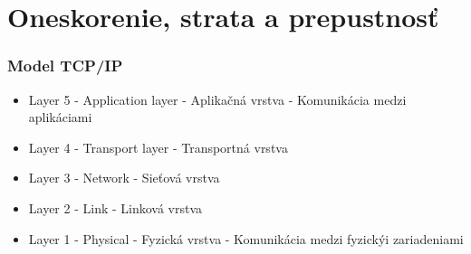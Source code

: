 \documentclass[10pt,xcolor=pdflatex,hyperref={unicode}]{beamer}
\begin{document}
    \section{Oneskorenie, strata a prepustnosť}
    \begin{frame}\frametitle{Model TCP/IP}
    \begin{itemize}
        \item Layer 5 - Application layer - Aplikačná vrstva - Komunikácia medzi aplikáciami
        \item Layer 4 - Transport layer - Transportná vrstva
        \item Layer 3 - Network - Sieťová vrstva
        \item Layer 2 - Link - Linková vrstva
        \item Layer 1 - Physical - Fyzická vrstva - Komunikácia medzi fyzickýi zariadeniami
    \end{itemize}
    \end{frame}


\end{document}
